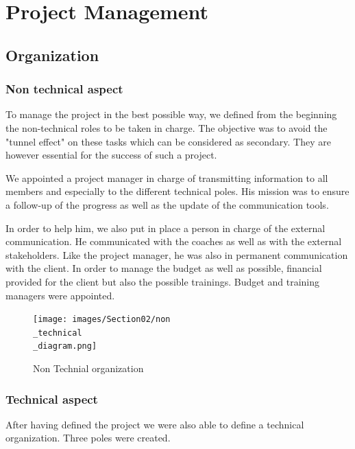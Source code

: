 \section{Project Management}\insertloftspace
\setcounter{figure}{0}\setcounter{table}{0}

\subsection{Organization}
\subsubsection{Non technical aspect}

\hspace{\parindent} To manage the project in the best possible way, we defined from the beginning the non-technical roles to be taken in charge. The objective was to avoid the "tunnel effect" on these tasks which can be considered as secondary. They are however essential for the success of such a project. 

\bigbreak
We appointed a project manager in charge of transmitting information to all members and especially to the different technical poles. His mission was to ensure a follow-up of the progress as well as the update of the communication tools. 

\bigbreak
In order to help him, we also put in place a person in charge of the external communication. He communicated with the coaches as well as with the external stakeholders. Like the project manager, he was also in permanent communication with the client. In order to manage the budget as well as possible, financial provided for the client but also the possible trainings. Budget and training managers were appointed. 

\begin{figure}[ht]
    \centering
    \texttt{[image: images/Section02/non\\\_technical\\\_diagram.png]}
    \caption{Non Technial organization}
    \label{fig:mesh2}
\end{figure}

\subsubsection{Technical aspect}

\hspace{\parindent} After having defined the project we were also able to define a technical organization. Three poles were created. 

